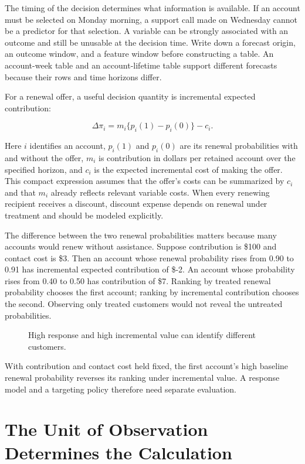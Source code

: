 The timing of the decision determines what information is available. If
an account must be selected on Monday morning, a support call made on
Wednesday cannot be a predictor for that selection. A variable can be
strongly associated with an outcome and still be unusable at the
decision time. Write down a forecast origin, an outcome window, and a
feature window before constructing a table. An account-week table and an
account-lifetime table support different forecasts because their rows
and time horizons differ.

For a renewal offer, a useful decision quantity is incremental expected
contribution:

\[
\Delta\pi_i=m_i\{p_i(1)-p_i(0)\}-c_i.
\]

Here \(i\) identifies an account, \(p_i(1)\) and \(p_i(0)\) are its
renewal probabilities with and without the offer, \(m_i\) is
contribution in dollars per retained account over the specified horizon,
and \(c_i\) is the expected incremental cost of making the offer. This
compact expression assumes that the offer's costs can be summarized by
\(c_i\) and that \(m_i\) already reflects relevant variable costs. When
every renewing recipient receives a discount, discount expense depends
on renewal under treatment and should be modeled explicitly.

The difference between the two renewal probabilities matters because
many accounts would renew without assistance. Suppose contribution is
\$100 and contact cost is \$3. Then an account whose renewal probability
rises from 0.90 to 0.91 has incremental expected contribution of \$-2.
An account whose probability rises from 0.40 to 0.50 has contribution of
\$7. Ranking by treated renewal probability chooses the first account;
ranking by incremental contribution chooses the second. Observing only
treated customers would not reveal the untreated probabilities.

\begin{figure}[htbp]
\centering

\caption{High response and high incremental value can identify different customers.}\label{fig:M01_response_vs_value}
\end{figure}

With contribution and contact cost held fixed, the first account's high
baseline renewal probability reverses its ranking under incremental
value. A response model and a targeting policy therefore need separate
evaluation.

\hypertarget{M01-the-unit-of-observation-determines-the-calculation}{%
\section{The Unit of Observation Determines the
Calculation}\label{M01-the-unit-of-observation-determines-the-calculation}}

